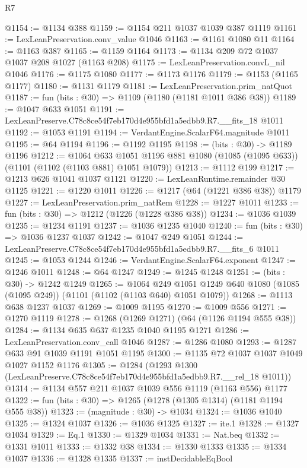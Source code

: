 \begin{lexlean}{R7}
\begin{coremodule}
@1154 := @1134 @388
@1159 := @1154 @211 @1037 @1039 @387 @1119
@1161 := LexLeanPreservation.conv_value @1046
@1163 := @1161 @1080 @11
@1164 := @1163 @387
@1165 := @1159 @1164
@1173 := @1134 @209 @72 @1037 @1037 @208 @1027 (@1163 @208)
@1175 := LexLeanPreservation.convL_nil @1046
@1176 := @1175 @1080
@1177 := @1173 @1176
@1179 := @1153 (@1165 @1177)
@1180 := @1131 @1179
@1181 := LexLeanPreservation.prim_natQuot
@1187 := fun (bits : @30) => @1109 (@1180 (@1181 @1011 @386 @38))
@1189 := @1047 @633 @1051
@1191 := LexLeanPreserve.C78c8ce54f7eb170d4e955bfd1a5edbb9.R7.__fits_18 @1011
@1192 := @1053 @1191
@1194 := VerdantEngine.ScalarF64.magnitude @1011
@1195 := @64 @1194
@1196 := @1192 @1195
@1198 := (bits : @30) -> @1189 @1196
@1212 := @1064
    @633
    @1051
    @1196
    @881
    @1080
    (@1085 (@1095 @633))
    (@1101 (@1102 (@1103 @881) @1051 @1079))
@1213 := @1112 @199
@1217 := @1213 @626 @1041 @1037 @1121
@1220 := LexLeanRuntime.remainder @30 @1125
@1221 := @1220 @1011
@1226 := @1217 (@64 (@1221 @386 @38)) @1179
@1227 := LexLeanPreservation.prim_natRem
@1228 := @1227 @1011
@1233 := fun (bits : @30) => @1212 (@1226 (@1228 @386 @38))
@1234 := @1036 @1039
@1235 := @1234 @1191
@1237 := @1036 @1235 @1040
@1240 := fun (bits : @30) => @1036 @1237 @1037
@1242 := @1047 @249 @1051
@1244 := LexLeanPreserve.C78c8ce54f7eb170d4e955bfd1a5edbb9.R7.__fits_6 @1011
@1245 := @1053 @1244
@1246 := VerdantEngine.ScalarF64.exponent
@1247 := @1246 @1011
@1248 := @64 @1247
@1249 := @1245 @1248
@1251 := (bits : @30) -> @1242 @1249
@1265 := @1064
    @249
    @1051
    @1249
    @640
    @1080
    (@1085 (@1095 @249))
    (@1101 (@1102 (@1103 @640) @1051 @1079))
@1268 := @1113 @638 @1237 @1037
@1269 := @1009 @1195
@1270 := @1009 @556
@1271 := @1270 @1119
@1278 := @1268 (@1269 @1271) (@64 (@1126 @1194 @555 @38))
@1284 := @1134 @635 @637 @1235 @1040 @1195 @1271
@1286 := LexLeanPreservation.conv_call @1046
@1287 := @1286 @1080
@1293 := @1287 @633 @91 @1039 @1191 @1051 @1195
@1300 := @1135 @72 @1037 @1037 @1049 @1027 @1152 @1176
@1305 := @1284 (@1293 @1300 (LexLeanPreserve.C78c8ce54f7eb170d4e955bfd1a5edbb9.R7.__rel_18 @1011))
@1314 := @1134 @557 @211 @1037 @1039 @556 @1119 (@1163 @556) @1177
@1322 := fun (bits : @30) => @1265 (@1278 (@1305 @1314) (@1181 @1194 @555 @38))
@1323 := (magnitude : @30) -> @1034
@1324 := @1036 @1040
@1325 := @1324 @1037
@1326 := @1036 @1325
@1327 := ite.{1}
@1328 := @1327 @1034
@1329 := Eq.{1}
@1330 := @1329 @1034
@1331 := Nat.beq
@1332 := @1331 @1011
@1333 := @1332 @38
@1334 := @1330 @1333
@1335 := @1334 @1037
@1336 := @1328 @1335
@1337 := instDecidableEqBool

\end{coremodule}
\end{lexlean}
